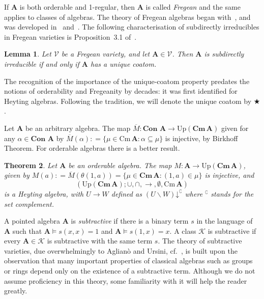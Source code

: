 \documentclass{amsart}
\newtheorem{theorem}{Theorem}[section]
\newtheorem{lemma}[theorem]{Lemma}
\newcommand{\deq}{\mathrel{\mathop:}=}
\newcommand{\alg}[1]{\mathbf{#1}}
\newcommand{\Con}[1]{\mathbf{Con}\, #1}
\newcommand{\Cm}[1]{\mathbf{Cm}\, #1}
\newcommand{\cm}[1]{\mathrm{Cm}\, #1}
\def\ra{\rightarrow}
\def\dw#1{{#1}\mathord{\downarrow}}
\def\HtM{\overline{M}}
\def\op{\bigstar}
\begin{document}
If $\alg{A}$ is both orderable and 1-regular,
then $\alg{A}$ is called \emph{Fregean} and the same applies to classes of
algebras. The theory of Fregean algebras began with~\cite{BKP84}, and was
developed in~\cite{ISW09} and~\cite{Slo12, Slo22}. The following
characterisation of subdirectly irreducibles in Fregean varieties
is Proposition~3.1 of~\cite{Slo12}. 

\begin{lemma}\label{lem:1-fregean-si}
Let $\mathcal{V}$ be a Fregean variety, and let $\alg{A}\in\mathcal{V}$. Then
$\alg{A}$ is subdirectly irreducible if and only if $\alg{A}$ has a unique coatom. 
\end{lemma}

The recognition of the importance of the unique-coatom property predates
the notions of orderability and Fregeanity by decades: it
was first identified for Heyting algebras. Following the
tradition, we will denote the unique coatom by $\op$.


Let $\alg{A}$ be an arbitrary algebra. The map
$\HtM\colon \Con\,\alg{A} \to \mathrm{Up}(\Cm{\alg{A}})$ 
given for any $\alpha\in\Con\,\alg{A}$ by
$\HtM(\alpha) \deq \{\mu\in\cm{\alg{A}}: \alpha\subseteq\mu\}$ 
is injective, by Birkhoff Theorem. For orderable algebras there is a better
result.

\begin{theorem}\label{thm:Heyting-from-cm}
Let $\alg{A}$ be an orderable algebra.
The map $M\colon \alg{A}\to \mathrm{Up}(\Cm{\alg{A}})$,
given by
$M(a)\deq \HtM(\theta(1,a)) = \{\mu\in\Cm{\alg{A}}: (1,a)\in\mu\}$
is injective, and
$$
(\mathrm{Up}(\Cm{\alg{A}}); \cup,\cap, \ra,\emptyset,\cm{\alg{A}})
$$
is a Heyting algebra, with $U\ra W$ defined as
$\dw{(U\smallsetminus W)}^\complement$
where ${}^\complement$ stands for the set complement.
\end{theorem}

A pointed algebra $\alg{A}$ is \emph{subtractive} if 
there is a binary term $s$ in the language of $\alg{A}$ such that
$\alg{A}\models s(x,x) = 1$ and $\alg{A}\models s(1,x) = x$.
A class $\mathcal{K}$ is subtractive if every $\alg{A}\in\mathcal{K}$ is
subtractive with the same term $s$.
The theory of subtractive varieties, due overwhelmingly to Aglian\`o and Ursini,
cf.~\cite{Urs94, AU96, AU97, AU97a, Urs00}, is built upon the observation that
many important properties of classical 
algebras such as groups or rings depend only on the existence of a subtractive
term. Although we do not assume
proficiency in this theory, some familiarity with it will help the reader
greatly.
\end{document}
